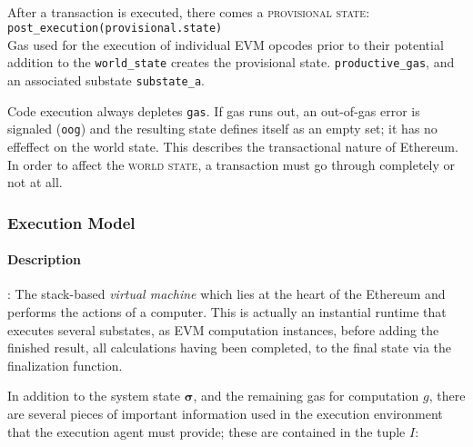 \documentclass[10pt,a4paper,leqno,bibliography=totoc]{scrartcl}
\newenvironment{alphafootnotes}
{\par\edef\savedfootnotenumber{\number\value{footnote}}
\renewcommand{\thefootnote}{\alph{footnote}}
\setcounter{footnote}{0}}
{\par\setcounter{footnote}{\savedfootnotenumber}}
\begin{document}
\begin{alphafootnotes}
\begin{multicols*}{2}
\paragraph{}After a transaction is executed, there comes a \textsc{provisional state}:
			\\
			\texttt{post\_execution(provisional.state)}
			\\
			Gas used for the execution of individual EVM opcodes prior to their potential addition to the \texttt{world\_state} creates the provisional state. \texttt{productive\_gas}, and an associated substate \texttt{substate\_a}. 
\par
																			Code execution always depletes \texttt{gas}. If gas runs out, an out-of-gas error is signaled (\texttt{oog}) and the resulting state defines itself as an empty set; it has no effeffect on the world state. This describes the transactional nature of Ethereum. In order to affect the \textsc{world state}, a transaction must go through completely or not at all. 


	
			\subsubsection{Execution Model}
				\paragraph{Description}: The stack-based \textsl{virtual machine} which lies at the heart of the Ethereum and performs the actions of a computer. This is actually an instantial runtime that executes several substates, as EVM computation instances, before adding the finished result, all calculations having been completed, to the final state  via the finalization function.  
	
				In addition to the system state $\boldsymbol{\sigma}$, and the remaining gas for computation $g$, there are several pieces of important information used in the execution environment that the execution agent must provide; these are contained in the tuple $I$:


\end{multicols*}
\end{alphafootnotes}
\end{document}

